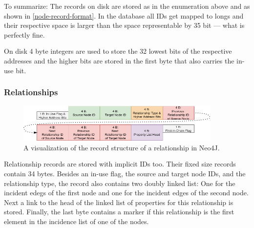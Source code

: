             To summarize: The records on disk are stored as in the enumeration above and as shown in \ref{node-record-format}. 
            In the database all IDs get mapped to longs and their respective space is larger than the space representable by 35 bit --- what is perfectly fine.
            
            On disk 4 byte integers are used to store the 32 lowest bits of the respective addresses and the higher bits are stored in the first byte that also carries the in-use bit.
        
        \subsubsection*{Relationships}
            \begin{figure}[htp]
                \begin{center}
                    \includegraphics[keepaspectratio,height=0.9\textheight,width=0.9\textwidth]{img/03-preliminaries/relationship_record.png}
                \end{center}
                \caption{A visualization of the record structure of a relationship in Neo4J.}
                \label{rel_record}
            \end{figure}
                
            Relationship records are stored with implicit IDs too. 
            Their fixed size records contain 34 bytes.
            Besides an in-use flag, the source and target node IDs, and the relationship type, the record also contains two doubly linked list: 
            One for the incident edegs of the first node and one for the incident edges of the second node.
            Next a link to the head of the linked list of properties for this relationship is stored.
            Finally, the last byte contains a marker if this relationship is the first element in the incidence list of one of the nodes.
            
